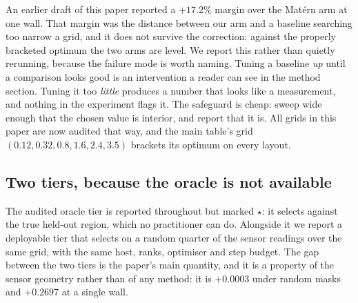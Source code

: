 An earlier draft of this paper reported a $+17.2\%$ margin over the Mat\'ern arm
at one wall.  That margin was the distance between our arm and a baseline
searching too narrow a grid, and it does not survive the correction: against the
properly bracketed optimum the two arms are level.  We report this rather than
quietly rerunning, because the failure mode is worth naming.  Tuning a baseline
\emph{up} until a comparison looks good is an intervention a reader can see in
the method section.  Tuning it too \emph{little} produces a number that looks
like a measurement, and nothing in the experiment flags it.  The safeguard is
cheap: sweep wide enough that the chosen value is interior, and report that it
is.  All grids in this paper are now audited that way, and the main table's
grid $(0.12, 0.32, 0.8, 1.6, 2.4, 3.5)$ brackets its optimum on every layout.

\subsection{Two tiers, because the oracle is not available}
The audited oracle tier is reported throughout but marked $\star$: it selects
against the true held-out region, which no practitioner can do.  Alongside it we
report a deployable tier that selects on a random quarter of the sensor readings
over the same grid, with the same host, ranks, optimiser and step budget.  The
gap between the two tiers is the paper's main quantity, and it is a property of
the sensor geometry rather than of any method: it is $+0.0003$ under random masks
and $+0.2697$ at a single wall.
